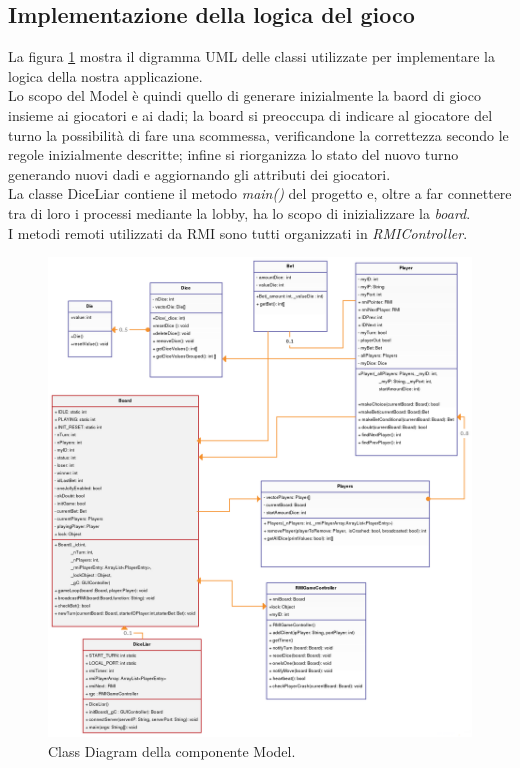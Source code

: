 \documentclass{llncs}
\begin{document}
\subsection{Implementazione della logica del gioco}
La figura \ref{Model} mostra il digramma UML delle classi utilizzate per implementare la logica della nostra applicazione.\\
Lo scopo del Model è quindi quello di generare inizialmente la baord di gioco insieme ai giocatori e ai dadi; la board si preoccupa di indicare al giocatore del turno la possibilità di fare una scommessa, verificandone la correttezza secondo le regole inizialmente descritte; infine si riorganizza lo stato del nuovo turno generando nuovi dadi e aggiornando gli attributi dei giocatori.\\
La classe DiceLiar contiene il metodo \textit{main()} del progetto e, oltre a far connettere tra di loro i processi mediante la lobby, ha lo scopo di inizializzare la \textit{board}.\\
I metodi remoti utilizzati da RMI sono tutti organizzati in \textit{RMIController}.
			\newpage
			\begin{figure}[H]
				\includegraphics[scale=0.35]{img/Model.png}
				\caption{\small{Class Diagram della componente Model.}}
				\label{Model}
			\end{figure}
			\newpage
\end{document}
